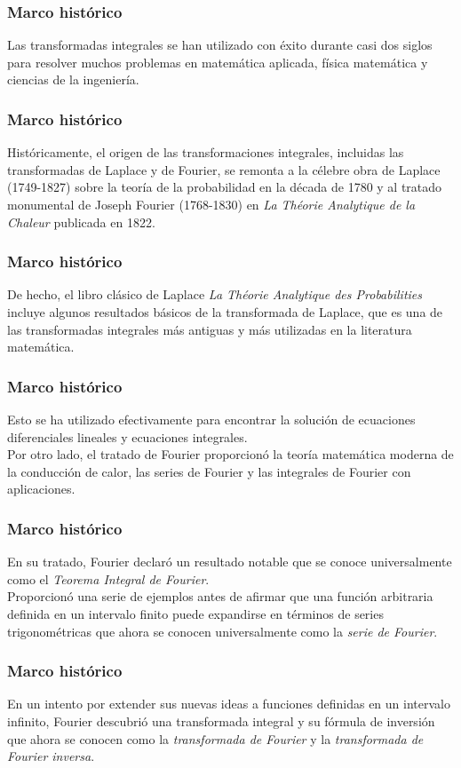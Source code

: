 \documentclass[12pt]{beamer}
\begin{document}
\begin{frame}
\frametitle{Marco histórico}
Las transformadas integrales se han utilizado con éxito durante casi dos siglos para resolver muchos problemas en matemática aplicada, física matemática y ciencias de la ingeniería.
\end{frame}
\begin{frame}
\frametitle{Marco histórico}
Históricamente, el origen de las transformaciones integrales, incluidas las transformadas de Laplace y de Fourier, se remonta a la célebre obra de Laplace (1749-1827) sobre la teoría de la probabilidad en la década de 1780 y al tratado monumental de Joseph Fourier (1768-1830) en \emph{La Théorie Analytique de la Chaleur} publicada en 1822.
\end{frame}
\begin{frame}
\frametitle{Marco histórico}
De hecho, el libro clásico de Laplace \emph{La Théorie Analytique des Probabilities} incluye algunos resultados básicos de la transformada de Laplace, que es una de las transformadas integrales más antiguas y más utilizadas en la literatura matemática. 
\end{frame}
\begin{frame}
\frametitle{Marco histórico}
Esto se ha utilizado efectivamente para encontrar la solución de ecuaciones diferenciales lineales y ecuaciones integrales.
\\
\bigskip
\pause
Por otro lado, el tratado de Fourier proporcionó la teoría matemática moderna de la conducción de calor, las series de Fourier y las integrales de Fourier con aplicaciones.
\end{frame}
\begin{frame}
\frametitle{Marco histórico}
En su tratado, Fourier declaró un resultado notable que se conoce universalmente como el \emph{Teorema Integral de Fourier}.
\\
\bigskip
\pause
Proporcionó una serie de ejemplos antes de afirmar que una función arbitraria definida en un intervalo finito puede expandirse en términos de series trigonométricas que ahora se conocen universalmente como la \emph{serie de Fourier}.
\end{frame}
\begin{frame}
\frametitle{Marco histórico}
En un intento por extender sus nuevas ideas a funciones definidas en un intervalo infinito, Fourier descubrió una transformada integral y su fórmula de inversión que ahora se conocen como la \emph{transformada de Fourier} y la \emph{transformada de Fourier inversa}.
\end{frame}
\end{document}
